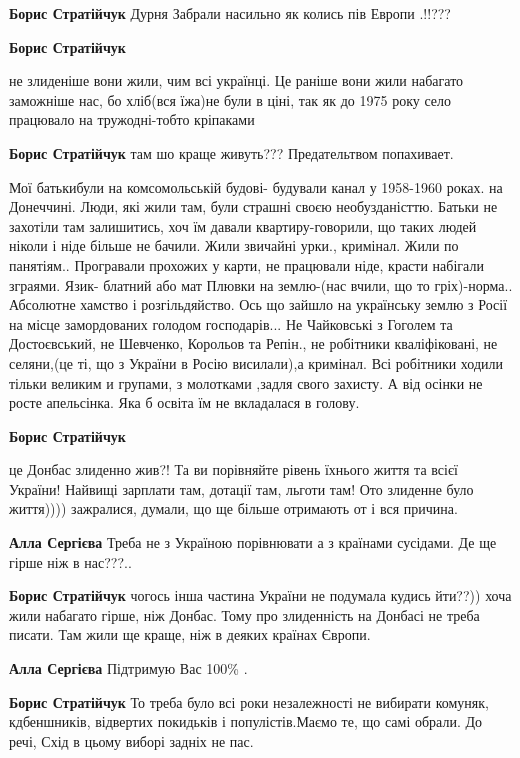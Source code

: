 \begin{itemize}
\begin{itemize}
\textbf{Борис Стратійчук}
Дурня
Забрали насильно як колись пів Европи .!!???

\textbf{Борис Стратійчук} 

не злиденіше вони жили, чим всі українці. Це раніше вони жили набагато заможніше
нас, бо хліб(вся їжа)не були в ціні, так як до 1975 року село працювало на
тружодні-тобто кріпаками

\textbf{Борис Стратійчук} там шо краще живуть??? Предательтвом попахивает.


Мої батькибули на комсомольській будові- будували канал у 1958-1960 роках. на
Донеччині. Люди, які жили там, були страшні своєю необузданісттю. Батьки не
захотіли там залишитись, хоч їм давали квартиру-говорили, що таких людей ніколи і
ніде більше не бачили. Жили звичайні урки., кримінал. Жили по панятіям.. Програвали
прохожих у карти, не працювали ніде, красти набігали зграями. Язик- блатний або
мат Плювки на землю-(нас вчили, що то гріх)-норма.. Абсолютне хамство і
розгільдяйство. Ось що зайшло на українську землю з Росії на місце замордованих
голодом господарів... Не Чайковські з Гоголем та Достоєвський, не Шевченко,
Корольов та Репін., не робітники кваліфіковані, не селяни,(це ті, що з України в
Росію висилали),а кримінал. Всі робітники ходили тільки великим и групами, з
молотками ,задля свого захисту. А від осінки не росте апельсінка. Яка б освіта їм
не вкладалася в голову.

\textbf{Борис Стратійчук} 

це Донбас злиденно жив?! Та ви порівняйте рівень їхнього життя та всієї
України! Найвищі зарплати там, дотації там, льготи там! Ото злиденне було
життя)))) зажралися, думали, що ще більше отримають от і вся причина.

\begin{itemize} %
\textbf{Алла Сергієва} Треба не з Україною порівнювати а з країнами сусідами. Де ще гірше ніж в нас???..

\textbf{Борис Стратійчук} чогось інша частина України не подумала кудись йти??)) хоча жили набагато гірше, ніж Донбас. Тому про злиденність на Донбасі не треба писати. Там жили ще краще, ніж в деяких країнах Європи.

\textbf{Алла Сергієва} Підтримую Вас 100\% .

\textbf{Борис Стратійчук} То треба було всі роки незалежності не вибирати комуняк, кдбеншників, відвертих покидьків і популістів.Маємо те, що самі обрали. До речі, Схід в цьому виборі задніх не пас.


\end{itemize}
\end{itemize}
\end{itemize}
